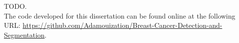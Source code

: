 TODO.\\

The code developed for this dissertation can be found online at the following URL: \url{https://github.com/Adamouization/Breast-Cancer-Detection-and-Segmentation}.